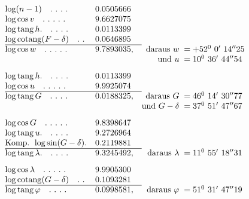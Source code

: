 \[
\begin{array}{@{}l@{\quad}r@{}l@{\quad}r@{\;}l@{}}
\log(n-1)\quad .\ .\ .\ .&0.0505666&&&\\
\log\cos v\quad .\ .\ .\ .\ .&9.6627075&&&\\
\log\operatorname{tang}h.\quad .\ .\ .\ .&0.0113399&&&\\
\log\operatorname{cotang}(F-\delta)\quad .\ .&0.0646895&&&\\\cline{1-3}
\log\cos w\quad .\ .\ .\ .\ .&9.7893035&,&\text{daraus }w&{}=+52^0\ 0'\ 14''25\\
&&&\text{und }u&{}=10^0\ 36'\ 44''54\\[8pt]
\log\operatorname{tang}h.\quad .\ .\ .\ .&0.0113399&&&\\
\log\cos u\quad .\ .\ .\ .\ .&9.9925074&&&\\\cline{1-3}
\log\operatorname{tang}G\quad .\ .\ .\ .&0.0188325&,&\text{daraus }G&{}=46^0\ 14'\ 30''77\\
&&&\text{und }G-\delta&{}=37^0\ 51'\ 47''67\\[8pt]
\log\cos G\quad .\ .\ .\ .\ .&9.8398647&&&\\
\log\operatorname{tang}u.\quad .\ .\ .\ .&9.2726964&&&\\
\text{Komp. }\log\sin(G-\delta).&0.2119881&&&\\\cline{1-3}
\log\operatorname{tang}\lambda.\quad .\ .\ .\ .&9.3245492&,&\text{daraus }\lambda&{}=11^0\ 55'\ 18''31\\[8pt]
\log\cos\lambda\quad .\ .\ .\ .\ .&9.9905300&&&\\
\log\operatorname{cotang}(G-\delta)\quad .\ .&0.1093281&&&\\\cline{1-3}
\log\operatorname{tang}\varphi\quad .\ .\ .\ .&0.0998581&,&\text{daraus }\varphi&{}=51^0\ 31'\ 47''19
\end{array}
\]

